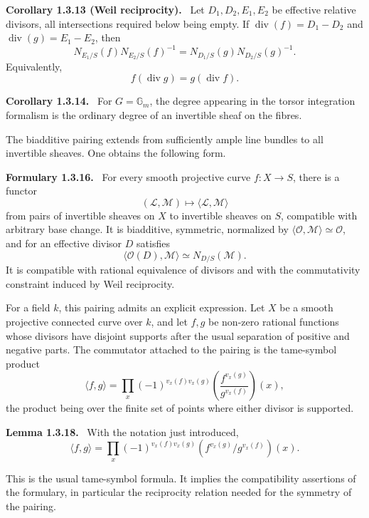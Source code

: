 \documentclass[12pt]{article}
\newcommand{\Ll}{\mathcal L}
\newcommand{\Mm}{\mathcal M}
\newcommand{\Ocal}{\mathcal O}
\newenvironment{statement}[1]{\par\medskip\noindent\textbf{#1.}\ }{\par\medskip}
\begin{document}
\begin{statement}{Corollary 1.3.13 \textnormal{(Weil reciprocity)}}
Let \(D_1,D_2,E_1,E_2\) be effective relative divisors, all intersections required below being empty. If \(\operatorname{div}(f)=D_1-D_2\) and \(\operatorname{div}(g)=E_1-E_2\), then
\[
N_{E_1/S}(f)N_{E_2/S}(f)^{-1}
= N_{D_1/S}(g)N_{D_2/S}(g)^{-1}.
\]
Equivalently,
\[
f(\operatorname{div}g)=g(\operatorname{div}f).
\]
\end{statement}

\begin{statement}{Corollary 1.3.14}
For \(G=\mathbb G_m\), the degree appearing in the torsor integration formalism is the ordinary degree of an invertible sheaf on the fibres.
\end{statement}

The biadditive pairing extends from sufficiently ample line bundles to all invertible sheaves. One obtains the following form.

\begin{statement}{Formulary 1.3.16}
For every smooth projective curve \(f:X\to S\), there is a functor
\[
(\Ll,\Mm)\longmapsto \langle\Ll,\Mm\rangle
\]
from pairs of invertible sheaves on \(X\) to invertible sheaves on \(S\), compatible with arbitrary base change. It is biadditive, symmetric, normalized by \(\langle\Ocal,\Mm\rangle\simeq\Ocal\), and for an effective divisor \(D\) satisfies
\[
\langle\Ocal(D),\Mm\rangle\simeq N_{D/S}(\Mm).
\]
It is compatible with rational equivalence of divisors and with the commutativity constraint induced by Weil reciprocity.
\end{statement}

For a field \(k\), this pairing admits an explicit expression. Let \(X\) be a smooth projective connected curve over \(k\), and let \(f,g\) be non-zero rational functions whose divisors have disjoint supports after the usual separation of positive and negative parts. The commutator attached to the pairing is the tame-symbol product
\[
\langle f,g\rangle
=\prod_{x}(-1)^{v_x(f)v_x(g)}
\left(\frac{f^{v_x(g)}}{g^{v_x(f)}}\right)(x),
\]
the product being over the finite set of points where either divisor is supported.

\begin{statement}{Lemma 1.3.18}
With the notation just introduced,
\[
\langle f,g\rangle
=\prod_{x}(-1)^{v_x(f)v_x(g)}
\left(f^{v_x(g)}/g^{v_x(f)}\right)(x).
\]
\end{statement}

This is the usual tame-symbol formula. It implies the compatibility assertions of the formulary, in particular the reciprocity relation needed for the symmetry of the pairing.
\end{document}
